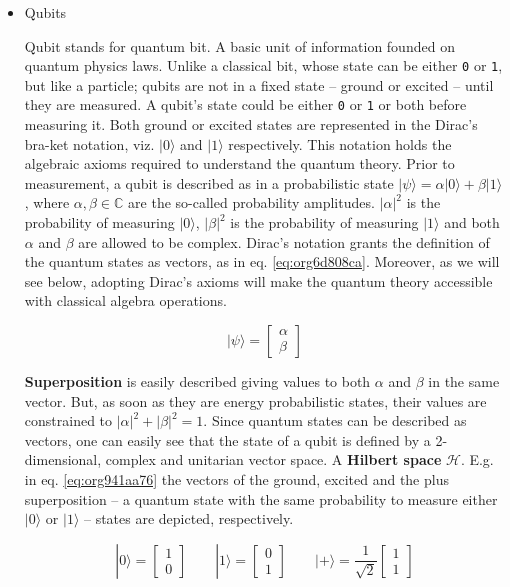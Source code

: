 \begin{itemize}
\item Qubits
\label{sec:org92e7731}

Qubit stands for quantum bit.
A basic unit of information founded on quantum physics laws.
Unlike a classical bit, whose state can be either \texttt{0} or \texttt{1}, but like a particle; qubits are not in a fixed state -- ground or excited -- until they are measured.
A qubit's state could be either \texttt{0} or \texttt{1} or both before measuring it.
Both ground or excited states are represented in the Dirac's bra-ket notation, viz. \(| 0 \rangle\) and \(| 1 \rangle\) respectively.
This notation holds the algebraic axioms \cite{Nielsen_2009} required to understand the quantum theory.
Prior to measurement, a qubit is described as in a probabilistic state \(| \psi \rangle = \alpha | 0 \rangle + \beta | 1 \rangle\), where \(\alpha, \beta \in \mathbb{C}\) are the so-called probability amplitudes.
\(|\alpha|^2\) is the probability of measuring \(| 0 \rangle\), \(|\beta|^2\) is the probability of measuring \(| 1 \rangle\) and both \(\alpha\) and \(\beta\) are allowed to be complex.
Dirac's notation grants the definition of the quantum states as vectors, as in eq. \ref{eq:org6d808ca}.
Moreover, as we will see below, adopting Dirac's axioms will make the quantum theory accessible with classical algebra operations. 

\begin{equation}
\label{eq:org6d808ca}
|\psi\rangle = \begin{bmatrix}\alpha \\ \beta \end{bmatrix}
\end{equation}

\textbf{Superposition} is easily described giving values to both \(\alpha\) and \(\beta\) in the same vector.
But, as soon as they are energy probabilistic states, their values are constrained to \(|\alpha|^2 + |\beta|^2 = 1\).
Since quantum states can be described as vectors, one can easily see that the state of a qubit is defined by a 2-dimensional, complex and unitarian vector space.
A \textbf{Hilbert space} \(\mathscr{H}\).
E.g. in eq. \ref{eq:org941aa76} the vectors of the ground, excited and the plus superposition -- a quantum state with the same probability to measure either \(|0\rangle\) or \(|1\rangle\) -- states are depicted, respectively.

\begin{equation}
\label{eq:org941aa76}
|0\rangle = \begin{bmatrix}1 \\ 0 \end{bmatrix} \quad \quad |1\rangle = \begin{bmatrix}0 \\ 1 \end{bmatrix} \quad \quad |+\rangle = \frac{1}{\sqrt{2}} \begin{bmatrix}1 \\ 1 \end{bmatrix}
\end{equation}


\end{itemize}
